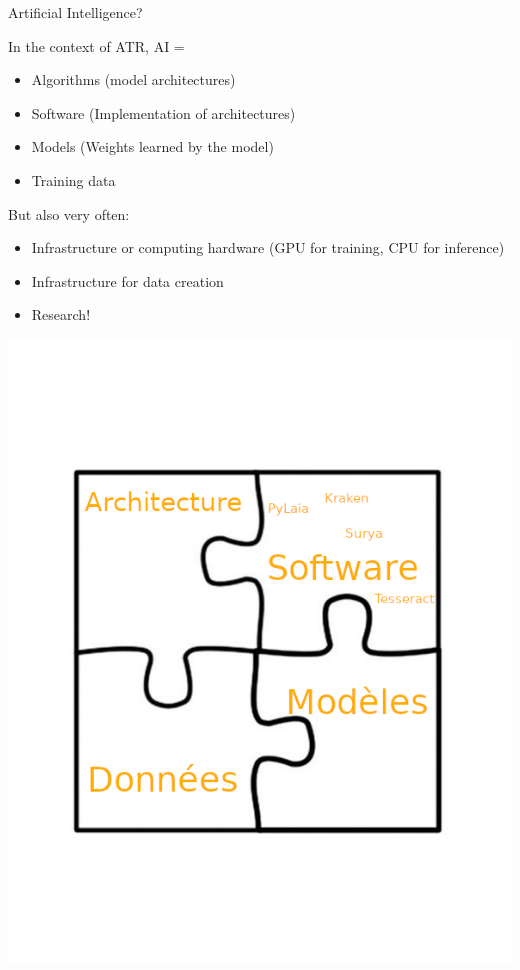 \documentclass[aspectratio=169]{beamer}
\begin{document}
\begin{frame}{Artificial Intelligence?}
    \begin{minipage}{.65\textwidth}
        In the context of ATR, AI = 
        \begin{itemize}
            \item Algorithms (model architectures)
            \item Software (Implementation of architectures)
            \item Models (Weights learned by the model)
            \item Training data
        \end{itemize}
        But also very often:
        \begin{itemize}
            \item Infrastructure or computing hardware (GPU for training, CPU for inference)
            \item Infrastructure for data creation
            \item Research!
        \end{itemize}
    \end{minipage} \hfill
    \begin{minipage}{.30\textwidth}
        \includegraphics[width=\linewidth]{cv-for-ch/images/PuzzleATR.png}
    \end{minipage}
\end{frame}
\end{document}
